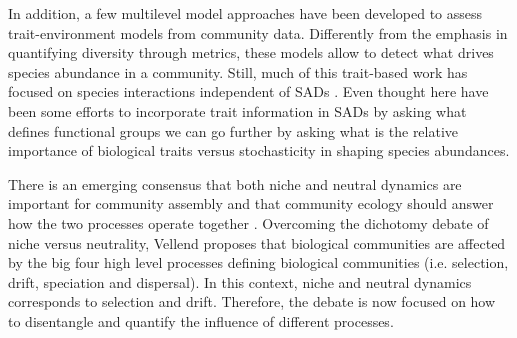 \documentclass[12pt]{article}
\begin{document}
In addition, a few multilevel model approaches \citep{Pollock2012, Jamil2013, Jamil2013a, Miller2019, TerBraak2019} have been developed to assess trait-environment models from community data. Differently from the emphasis in quantifying diversity through metrics, these models allow to detect what drives species abundance in a community.
Still, much of this trait-based work has focused on species interactions independent of SADs \citep{Swenson2012}. 
Even thought here have been some efforts to incorporate trait information in SADs \citep{Magurran2003, Supp2015} by asking what defines functional groups we can go further by asking what is the relative importance of biological traits versus stochasticity in shaping species abundances.

 
There is an emerging consensus that both niche and neutral dynamics are important for community assembly \citep{Vellend2014} and that community ecology should answer how the two processes operate together \citep{Gravel2006, Herault2007, Ovaskainen2017}. Overcoming the dichotomy debate of niche versus neutrality, Vellend proposes that biological communities are affected by the big four high level processes defining biological communities (i.e. selection, drift, speciation and dispersal). In this context, niche and neutral dynamics %
corresponds to
selection and drift. Therefore, the debate is now focused on how to disentangle and quantify the influence of different processes. %
\end{document}

